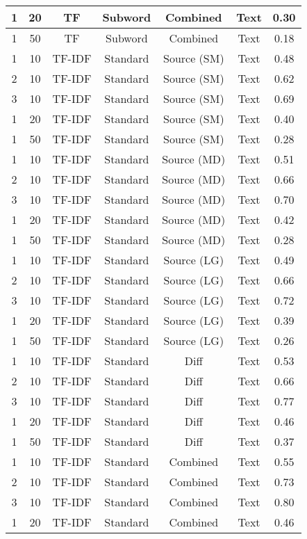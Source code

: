 \begin{longtable}{|c|c|c|c|c|c|c|}
\hline
1 & 20 & TF & Subword & Combined & Text & 0.30 \\
\hline
1 & 50 & TF & Subword & Combined & Text & 0.18 \\
\hline
1 & 10 & TF-IDF & Standard & Source (SM) & Text & 0.48 \\
\hline
2 & 10 & TF-IDF & Standard & Source (SM) & Text & 0.62 \\
\hline
3 & 10 & TF-IDF & Standard & Source (SM) & Text & 0.69 \\
\hline
1 & 20 & TF-IDF & Standard & Source (SM) & Text & 0.40 \\
\hline
1 & 50 & TF-IDF & Standard & Source (SM) & Text & 0.28 \\
\hline
1 & 10 & TF-IDF & Standard & Source (MD) & Text & 0.51 \\
\hline
2 & 10 & TF-IDF & Standard & Source (MD) & Text & 0.66 \\
\hline
3 & 10 & TF-IDF & Standard & Source (MD) & Text & 0.70 \\
\hline
1 & 20 & TF-IDF & Standard & Source (MD) & Text & 0.42 \\
\hline
1 & 50 & TF-IDF & Standard & Source (MD) & Text & 0.28 \\
\hline
1 & 10 & TF-IDF & Standard & Source (LG) & Text & 0.49 \\
\hline
2 & 10 & TF-IDF & Standard & Source (LG) & Text & 0.66 \\
\hline
3 & 10 & TF-IDF & Standard & Source (LG) & Text & 0.72 \\
\hline
1 & 20 & TF-IDF & Standard & Source (LG) & Text & 0.39 \\
\hline
1 & 50 & TF-IDF & Standard & Source (LG) & Text & 0.26 \\
\hline
1 & 10 & TF-IDF & Standard & Diff & Text & 0.53 \\
\hline
2 & 10 & TF-IDF & Standard & Diff & Text & 0.66 \\
\hline
3 & 10 & TF-IDF & Standard & Diff & Text & 0.77 \\
\hline
1 & 20 & TF-IDF & Standard & Diff & Text & 0.46 \\
\hline
1 & 50 & TF-IDF & Standard & Diff & Text & 0.37 \\
\hline
1 & 10 & TF-IDF & Standard & Combined & Text & 0.55 \\
\hline
2 & 10 & TF-IDF & Standard & Combined & Text & 0.73 \\
\hline
3 & 10 & TF-IDF & Standard & Combined & Text & 0.80 \\
\hline
1 & 20 & TF-IDF & Standard & Combined & Text & 0.46 \\

\end{longtable}
